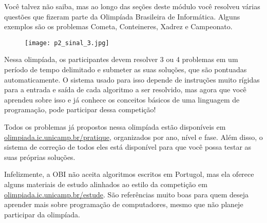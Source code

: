 \label{comp-know6}

Você talvez não saiba, mas ao longo das seções deste módulo você resolveu várias questões que fizeram parte da Olimpíada Brasileira de Informática. Alguns exemplos são os problemas Cometa, Conteineres, Xadrez e Campeonato.

\begin{figure}[H]
\centering

\texttt{[image: p2\_sinal\_3.jpg]}
\end{figure}

Nessa olimpíada, os participantes devem resolver 3 ou 4 problemas em um período de tempo delimitado e submeter as suas soluções, que são pontuadas automaticamente. O sistema usado para isso depende de instruções muito rígidas para a entrada e saída de cada algoritmo a ser resolvido, mas agora que você aprendeu sobre isso e já conhece os conceitos básicos de uma linguagem de programação, pode participar dessa competição!

Todos os problemas já propostos nessa olimpíada estão disponíveis em \url{olimpiada.ic.unicamp.br/pratique}, organizados por ano, nível e fase. Além disso, o sistema de correção de todos eles está disponível para que você possa testar as suas próprias soluções.

Infelizmente, a OBI não aceita algoritmos escritos em Portugol, mas ela oferece alguns materiais de estudo alinhados ao estilo da competição em \url{olimpiada.ic.unicamp.br/estude}. São referências muito boas para quem deseja aprender mais sobre programação de computadores, mesmo que não planeje participar da olimpíada.


\ifnum{}
\clearpage
\else
\notasfinais
\fi




\nocite{*}